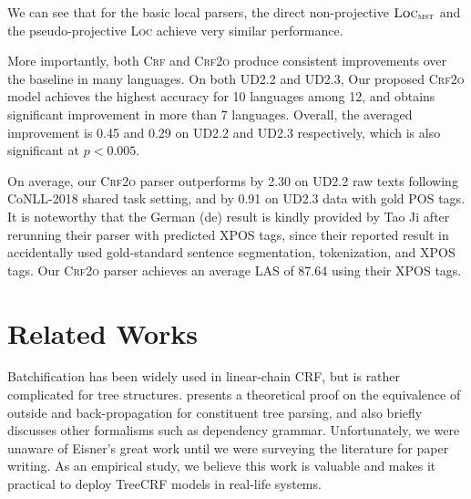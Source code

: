 \documentclass[11pt,a4paper]{article}
\begin{document}
We can see that for the basic local parsers,
the direct non-projective $\textsc{Loc}_{\textsc{mst}}$ and the pseudo-projective \textsc{Loc}
achieve very similar performance.

More importantly, both \textsc{Crf} and \textsc{Crf2o} produce consistent improvements over the baseline in many languages.
On both UD2.2 and UD2.3, Our proposed \textsc{Crf2o} model achieves the highest accuracy for 10 languages among 12, and obtains significant improvement in more than 7 languages.
Overall, the averaged improvement is 0.45 and 0.29 on UD2.2 and UD2.3 respectively, which is also significant at $p<0.005$.

On average, our \textsc{Crf2o} parser outperforms \citet{ji-etal-2019-graph} by 2.30 on UD2.2 raw texts following CoNLL-2018 shared task setting, and \citet{zhang-etal-2019-empirical} by 0.91 on UD2.3 data with gold POS tags.
It is noteworthy that the German (de) result is kindly provided by Tao Ji after rerunning their parser with predicted XPOS tags, since their reported result in \citet{ji-etal-2019-graph} accidentally used gold-standard sentence segmentation, tokenization, and XPOS tags.
Our \textsc{Crf2o} parser achieves an average LAS of 87.64 using their XPOS tags.









%
 
 \section{Related Works}
\label{section:relwork}



Batchification has been widely used in linear-chain CRF, but is rather complicated for tree structures.
\citet{eisner-2016-inside} presents a theoretical proof on the equivalence of outside and back-propagation for constituent tree parsing, and also briefly discusses other formalisms such as dependency grammar.
Unfortunately, we were unaware of Eisner's great work until we were surveying the literature for paper writing.
As an empirical study, we believe this work is valuable and makes it practical to deploy TreeCRF models in real-life systems.
\end{document}
